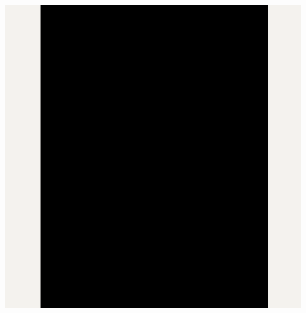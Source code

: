 \Continuing
\begin{center}
    \includegraphics[width=40em]{gde-member-interviewer-linkedin-p4_public}
\end{center}

\pagebreak
